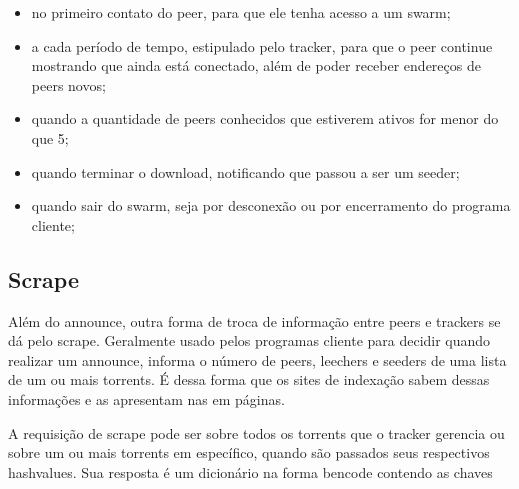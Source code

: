 \begin{itemize}
    \item no primeiro contato do \gls*{peer}, para que ele tenha acesso a um
        \gls*{swarm};

    \item a cada período de tempo, estipulado pelo tracker, para que o \gls*{peer}
        continue mostrando que ainda está conectado, além de poder receber endereços de
        \glspl*{peer} novos;

    \item quando a quantidade de \glspl*{peer} conhecidos que estiverem ativos for
        menor do que 5;

    \item quando terminar o download, notificando que passou a ser um \gls*{seeder};

    \item quando sair do \gls*{swarm}, seja por desconexão ou por encerramento do
        programa cliente;
\end{itemize}

\newpage
\subsection*{Scrape}

Além do \gls*{announce}, outra forma de troca de informação entre \glspl*{peer} e
\glspl*{tracker} se dá pelo \gls{scrape}. Geralmente usado pelos programas cliente para
decidir quando realizar um \gls*{announce}, informa o número de \glspl*{peer},
\glspl*{leecher} e \glspl*{seeder} de uma lista de um ou mais \glspl*{torrent}. É dessa
forma que os sites de indexação sabem dessas informações e as apresentam nas em páginas.

A requisição de \gls*{scrape} pode ser sobre todos os \glspl*{torrent} que o
\gls*{tracker} gerencia ou sobre um ou mais \glspl*{torrent} em específico, quando são
passados seus respectivos \glspl*{hashvalue}. Sua resposta é um dicionário na forma
\gls*{bencode} contendo as chaves

